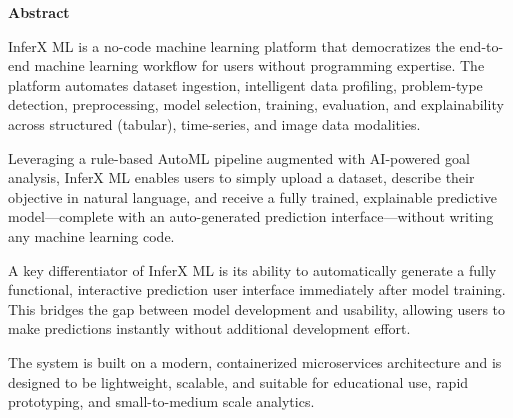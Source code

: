 \newpage
{}
\thispagestyle{empty}

\vspace*{-1cm} 

\begin{center}
    \large\textbf{Abstract}
\end{center}

\vspace{1cm} 

\par
InferX ML is a no-code machine learning platform that democratizes the end-to-end machine learning workflow for users without programming expertise. The platform automates dataset ingestion, intelligent data profiling, problem-type detection, preprocessing, model selection, training, evaluation, and explainability across structured (tabular), time-series, and image data modalities.

Leveraging a rule-based AutoML pipeline augmented with AI-powered goal analysis, InferX ML enables users to simply upload a dataset, describe their objective in natural language, and receive a fully trained, explainable predictive model—complete with an auto-generated prediction interface—without writing any machine learning code.

A key differentiator of InferX ML is its ability to automatically generate a fully functional, interactive prediction user interface immediately after model training. This bridges the gap between model development and usability, allowing users to make predictions instantly without additional development effort.

The system is built on a modern, containerized microservices architecture and is designed to be lightweight, scalable, and suitable for educational use, rapid prototyping, and small-to-medium scale analytics.

\newpage